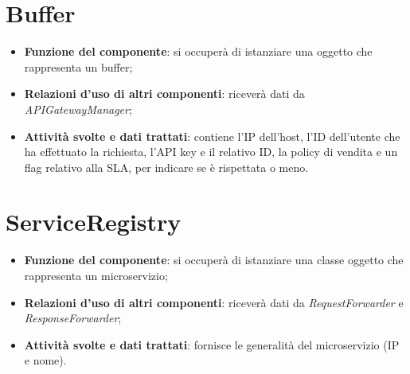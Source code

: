 \chapter{\textbf{Buffer}}
\begin{itemize}
	\item \textbf{Funzione del componente}: si occuperà di istanziare una oggetto che rappresenta un buffer;
	\item \textbf{Relazioni d'uso di altri componenti}: riceverà dati da \textit{APIGatewayManager};
	\item \textbf{Attività svolte e dati trattati}: contiene l'IP dell'host, l'ID dell'utente che ha effettuato la richiesta, l'API key e il relativo ID, la policy di vendita e un flag relativo alla SLA, per indicare se è rispettata o meno.
\end{itemize}

\chapter{\textbf{ServiceRegistry}}
\begin{itemize}
	\item \textbf{Funzione del componente}: si occuperà di istanziare una classe oggetto che rappresenta un microservizio;
	\item \textbf{Relazioni d'uso di altri componenti}: riceverà dati da \textit{RequestForwarder} e \textit{ResponseForwarder};
	\item \textbf{Attività svolte e dati trattati}: fornisce le generalità del microservizio (IP e nome).
\end{itemize}